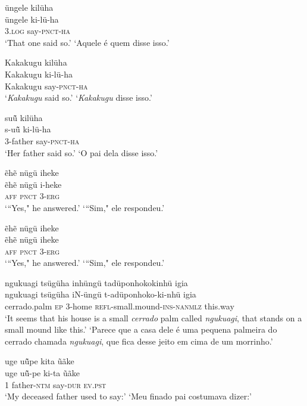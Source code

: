 \documentclass[output=paper,
modfonts,nonflat
]{langsci/langscibook}
\begin{document}
\ea  üngele kilüha\\[.3em]
\gll üngele ki-lü-ha\\
     \textsc{3.log} say-\textsc{pnct}-\textsc{ha}\\
\glt ‘That one said so.’
\glt ‘Aquele é quem disse isso.’
\z

\ea  Kakakugu kilüha\\[.3em]
\gll Kakakugu ki-lü-ha\\
     Kakakugu say-\textsc{pnct}-\textsc{ha}\\
\glt ‘\textit{Kakakugu} said so.’
\glt ‘\textit{Kakakugu} disse isso.’
\z

\ea  suü̃ kilüha\\[.3em]
\gll s-uü̃ ki-lü-ha\\
     3-father say-\textsc{pnct}-\textsc{ha}\\
\glt ‘Her father said so.’
\glt ‘O pai dela disse isso.’
\z

\ea  ẽhẽ nügü iheke\\[.3em]
\gll ẽhẽ nügü i-heke\\
     \textsc{aff} \textsc{pnct} 3-\textsc{erg}\\
\glt ‘“Yes," he answered.’
\glt ‘“Sim," ele respondeu.’
\z

\ea  ẽhẽ nügü iheke\\[.3em]
\gll ẽhẽ nügü iheke\\
     \textsc{aff} \textsc{pnct} 3-\textsc{erg}\\
\glt ‘“Yes," he answered.’
\glt ‘“Sim," ele respondeu.’
\z

\largerpage
\ea  ngukuagi tsügüha inhüngü tadüponhokokinhü igia\\[.3em]
\gll ngukuagi tsügüha iN-üngü t-adüponhoko-ki-nhü igia\\
     cerrado.palm \textsc{ep} 3-home \textsc{refl}-small.mound-\textsc{ins}-\textsc{nanmlz} this.way\\
\glt ‘It seems that his house is a small \textit{cerrado} palm called \textit{ngukuagi}, that stands on a small mound like this.’
\newpage
\glt ‘Parece que a casa dele é uma pequena palmeira do cerrado chamada \textit{ngukuagi}, que fica desse jeito em cima de um morrinho.’
\z

\ea  uge uü̃pe kita ũãke\\[.3em]
\gll uge uü̃-pe ki-ta ũãke\\
     \textsc{1} father-\textsc{ntm} say-\textsc{dur} \textsc{ev.pst}\\
\glt ‘My deceased father used to say:’
\glt ‘Meu finado pai costumava dizer:’
\z
\end{document}
